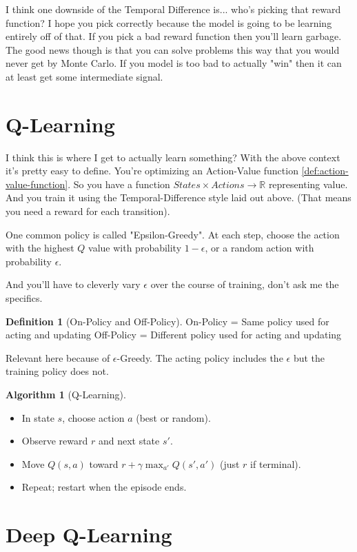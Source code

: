 \documentclass[11pt,notitlepage]{report}
\theoremstyle{definition}
\newtheorem{definition}{Definition}
\newtheorem{algorithm}{Algorithm}
\theoremstyle{plain}
\begin{document}
I think one downside of the Temporal Difference is... who's picking that reward function?
I hope you pick correctly because the model is going to be learning entirely off of that.
If you pick a bad reward function then you'll learn garbage.
The good news though is that you can solve problems this way that you would never get
by Monte Carlo. If you model is too bad to actually "win" then it can at least get
some intermediate signal.

\section{Q-Learning}
I think this is where I get to actually learn something?
With the above context it's pretty easy to define.
You're optimizing an Action-Value function \ref{def:action-value-function}.
So you have a function $States \times Actions \to \mathbb{R}$ representing value.
And you train it using the Temporal-Difference style laid out above.
(That means you need a reward for each transition).

One common policy is called "Epsilon-Greedy".
At each step, choose the action with the highest $Q$ value with probability
$1-\epsilon$, or a random action with probability $\epsilon$.

And you'll have to cleverly vary $\epsilon$ over the course of training,
don't ask me the specifics.

\begin{definition}[On-Policy and Off-Policy]
    On-Policy = Same policy used for acting and updating
    Off-Policy = Different policy used for acting and updating
\end{definition}

Relevant here because of $\epsilon$-Greedy. The acting policy includes the
$\epsilon$ but the training policy does not.

\begin{algorithm}[Q-Learning]
\begin{itemize}
\item In state $s$, choose action $a$ (best or random).
\item Observe reward $r$ and next state $s'$.
\item Move $Q(s,a)$ toward $r + \gamma \max_{a'} Q(s',a')$ (just $r$ if terminal).
\item Repeat; restart when the episode ends.
\end{itemize}
\end{algorithm}

\section{Deep Q-Learning}
\end{document}
